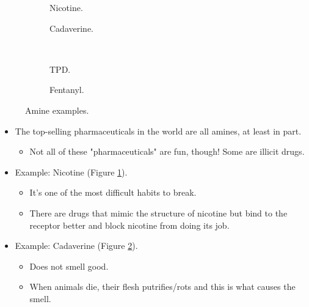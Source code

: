 \documentclass[../notes.tex]{subfiles}
\begin{document}
\begin{itemize}
\begin{figure}[H]
\begin{subfigure}[b]{0.49\linewidth}
            \caption{Nicotine.}
            \label{fig:amineExa}
        \end{subfigure}
        \begin{subfigure}[b]{0.49\linewidth}
            \centering
            \caption{Cadaverine.}
            \label{fig:amineExb}
        \end{subfigure}\\[2em]
        \begin{subfigure}[b]{0.49\linewidth}
            \centering
            \caption{TPD.}
            \label{fig:amineExc}
        \end{subfigure}
        \begin{subfigure}[b]{0.49\linewidth}
            \centering
            \caption{Fentanyl.}
            \label{fig:amineExd}
        \end{subfigure}
        \caption{Amine examples.}
        \label{fig:amineEx}
    \end{figure}
    \begin{itemize}
        \item The top-selling pharmaceuticals in the world are all amines, at least in part.
        \begin{itemize}
            \item Not all of these "pharmaceuticals" are fun, though! Some are illicit drugs.
        \end{itemize}
        \item Example: Nicotine (Figure \ref{fig:amineExa}).
        \begin{itemize}
            \item It's one of the most difficult habits to break.
            \item There are drugs that mimic the structure of nicotine but bind to the receptor better and block nicotine from doing its job.
        \end{itemize}
        \item Example: Cadaverine (Figure \ref{fig:amineExb}).
        \begin{itemize}
            \item Does not smell good.
            \item When animals die, their flesh putrifies/rots and this is what causes the smell.

\end{itemize}
\end{itemize}
\end{itemize}
\end{document}
